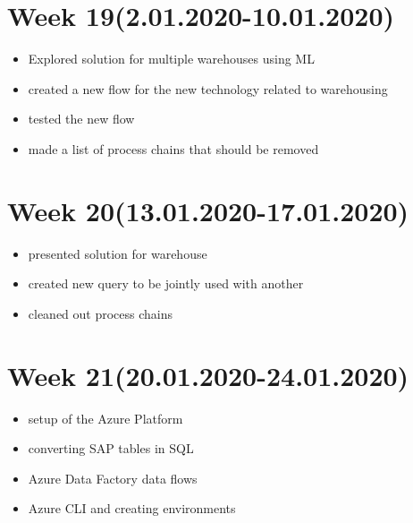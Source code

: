 \documentclass{article}
\begin{document}
	\section{Week 19(2.01.2020-10.01.2020)}
	\begin{itemize}
		\item Explored solution for multiple warehouses using ML
		\item created a new flow for the new technology related to warehousing
		\item tested the new flow
		\item made a list of process chains that should be removed
	\end{itemize}

	\section{Week 20(13.01.2020-17.01.2020)}
	\begin{itemize}
		\item presented solution for warehouse
		\item created new query to be jointly used with another
		\item cleaned out process chains
	\end{itemize}
	
	\section{Week 21(20.01.2020-24.01.2020)}
	\begin{itemize}
		\item setup of the Azure Platform
		\item converting SAP tables in SQL
		\item Azure Data Factory data flows
		\item Azure CLI and creating environments
	\end{itemize}
\end{document}
